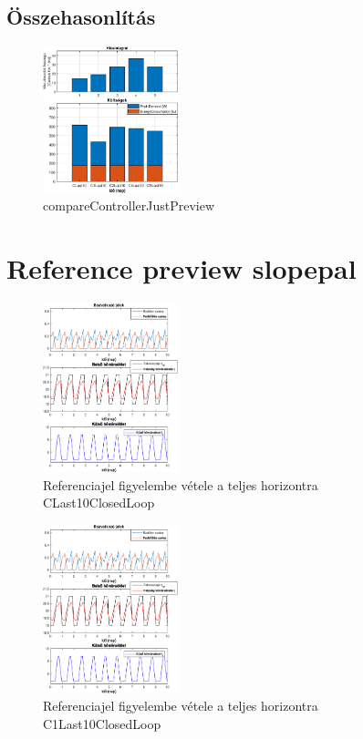 \subsection{Összehasonlítás}
\begin{figure}[H]
	\centering
	\includegraphics[width=0.35\textwidth, trim=0 0 0 0, clip,]{figures/onlab/NoSlope/compareControllerJustPreview}
	\caption{compareControllerJustPreview}
	\label{fig:onlab-refprevComp}
\end{figure}

\pagebreak


\section{Reference preview slopepal}

\begin{figure}[H]
	\centering
	\includegraphics[width=0.35\textwidth, trim=0 0 0 0, clip,]{figures/onlab/Slope/CLast10ClosedLoop}
	\caption{Referenciajel figyelembe vétele a teljes horizontra CLast10ClosedLoop}
	\label{fig:onlab-refslprev}
\end{figure}

\begin{figure}[H]
	\centering
	\includegraphics[width=0.35\textwidth, trim=0 0 0 0, clip,]{figures/onlab/Slope/C1Last10ClosedLoop}
	\caption{Referenciajel figyelembe vétele a teljes horizontra C1Last10ClosedLoop}
	\label{fig:onlab-refslprev2}
\end{figure}

